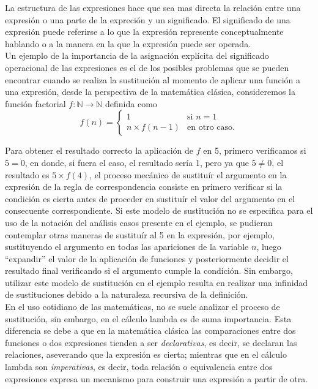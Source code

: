 La estructura de las expresiones hace que sea mas directa la relación entre una
expresión o una parte de la expreción y un significado. El significado de una
expresión puede referirse a lo que la expresión represente conceptualmente
hablando o a la manera en la que la expresión puede ser operada.\\

Un ejemplo de la importancia de la asignación explícita del significado
operacional de las expresiones es el de los posibles problemas que se pueden
encontrar cuando se realiza la sustitución al momento de aplicar una función a
una expresión, desde la perspectiva de la matemática clásica, consideremos la
función factorial \(f : \mathbb{N} \to \mathbb{N}\) definida como
\[f(n)=
\begin{cases}
  1 &\mbox{si } n=1\\
  n\times f(n-1) & \mbox{en otro caso.}
\end{cases}
\]

Para obtener el resultado correcto la aplicación de \(f\) en 5, primero
verificamos si \(5=0\), en donde, si fuera el caso, el resultado sería 1, pero
ya que \(5\not= 0\), el resultado es \(5\times f(4)\), el proceso mecánico de
sustituír el argumento en la expresión de la regla de correspondencia consiste
en primero verificar si la condición es cierta antes de proceder en sustituír el
valor del argumento en el consecuente correspondiente. Si este modelo de
sustitución no se especifica para el uso de la notación del análisis casos
presente en el ejemplo, se pudieran contemplar otras maneras de sustituír al 5
en la expresión, por ejemplo, sustituyendo el argumento en todas las apariciones
de la variable \(n\), luego ``expandir'' el valor de la aplicación de funciones y
posteriormente decidir el resultado final verificando si el argumento cumple la
condición. Sin embargo, utilizar este modelo de sustitución en el ejemplo resulta en
realizar una infinidad de sustituciones debido a la naturaleza recursiva de la
definición.\\

En el uso cotidiano de las matemáticas, no se suele analizar el proceso de
sustitución, sin embargo, en el cálculo lambda es de suma importancia. Esta
diferencia se debe a que en la matemática clásica las comparaciones entre dos
funciones o dos expresiones tienden a ser \emph{declarativas}, es decir, se
declaran las relaciones, aseverando que la expresión es cierta; mientras que en
el cálculo lambda son \emph{imperativas}, es decir, toda relación o equivalencia
entre dos expresiones expresa un mecanismo para construir una expresión a partir
de otra.\\

